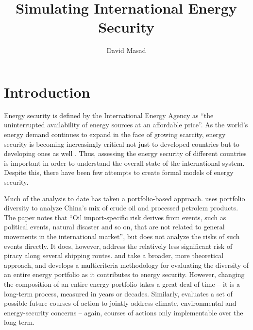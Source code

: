 \documentclass{article}
\begin{document}
\title{Simulating International Energy Security}
	\author{David Masad}
	\maketitle

\section{Introduction}

Energy security is defined by the International Energy Agency as ``the uninterrupted availability of energy sources at an affordable price''\citep{iea_2013}. As the world's energy demand continues to expand in the face of growing scarcity, energy security is becoming increasingly critical not just to developed countries but to developing ones as well \citep{yergin_2006}. Thus, assessing the energy security of different countries is important in order to understand the overall state of the international system. Despite this, there have been few attempts to create formal models of energy security. 

Much of the analysis to date has taken a portfolio-based approach. \citet{wu_2009} uses portfolio diversity to analyze China's mix of crude oil and processed petrolem products. The paper notes that ``Oil import-specific risk derives from events, such as political events, natural disaster and so on, that are not related to general movements in the international market'', but does not analyze the risks of such events directly. It does, however, address the relatively less significant risk of piracy along several shipping routes. \citet{stirling_2010} and \citet{skea_2010} take a broader, more theoretical approach, and develops a multicriteria methodology for evaluating the diversity of an entire energy portfolio as it contributes to energy security. However, changing the composition of an entire energy portfolio takes a great deal of time -- it is a long-term process, measured in years or decades. Similarly, \citet{jacobson_2009} evaluates a set of possible future courses of action to jointly address climate, environmental and energy-security concerns -- again, courses of actions only implementable over the long term.
\end{document}
